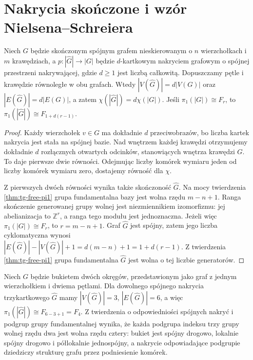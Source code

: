 \section{Nakrycia skończone i wzór Nielsena--Schreiera}
\label{sec:tg-finite-cover}

\begin{twierdzenie}
Niech $G$ będzie skończonym spójnym grafem nieskierowanym
o $n$ wierzchołkach i $m$ krawędziach, a
$p:|\widehat G|\to|G|$ będzie $d$-kartkowym nakryciem grafowym
o spójnej przestrzeni nakrywającej, gdzie $d\geq1$
jest liczbą całkowitą. Dopuszczamy pętle i krawędzie
równoległe w obu grafach.
Wtedy $|V(\widehat G)|=d|V(G)|$ oraz
$|E(\widehat G)|=d|E(G)|$, a zatem
$\chi(|\widehat G|)=d\chi(|G|)$.
Jeśli $\pi_1(|G|)\cong F_r$, to
$\pi_1(|\widehat G|)\cong F_{1+d(r-1)}$.
\end{twierdzenie}

\begin{proof}
Każdy wierzchołek $v\in G$ ma dokładnie $d$ przeciwobrazów,
bo liczba kartek nakrycia jest stała na spójnej bazie.
Nad wnętrzem każdej krawędzi otrzymujemy dokładnie $d$
rozłącznych otwartych odcinków, stanowiących wnętrza
krawędzi $\widehat G$. To daje pierwsze dwie równości.
Odejmując liczby komórek wymiaru jeden od liczby
komórek wymiaru zero, dostajemy równość dla $\chi$.

Z pierwszych dwóch równości wynika także skończoność
$\widehat G$. Na mocy twierdzenia \ref{thm:tg-free-pi1}
grupa fundamentalna bazy jest wolna rzędu $m-n+1$.
Ranga skończenie generowanej grupy wolnej jest
niezmiennikiem izomorfizmu: jej abelianizacja to
$\mathbb Z^r$, a ranga tego modułu jest jednoznaczna.
Jeżeli więc $\pi_1(|G|)\cong F_r$, to $r=m-n+1$.
Graf $\widehat G$ jest spójny, zatem jego liczba cyklomatyczna
wynosi
$|E(\widehat G)|-|V(\widehat G)|+1
=d(m-n)+1=1+d(r-1)$.
Z twierdzenia \ref{thm:tg-free-pi1} grupa fundamentalna
$\widehat G$ jest wolna o tej liczbie generatorów.
\end{proof}

\begin{przyklad}
Niech $G$ będzie bukietem dwóch okręgów, przedstawionym jako
graf z jednym wierzchołkiem i dwiema pętlami. Dla dowolnego
spójnego nakrycia trzykartkowego $\widehat G$ mamy
$|V(\widehat G)|=3$, $|E(\widehat G)|=6$, a więc
$\pi_1(|\widehat G|)\cong F_{6-3+1}=F_4$.
Z twierdzenia o odpowiedniości spójnych nakryć
i podgrup grupy fundamentalnej wynika, że każda
podgrupa indeksu trzy grupy wolnej rzędu dwa jest
wolna rzędu cztery: bukiet jest spójny drogowo,
lokalnie spójny drogowo i półlokalnie jednospójny,
a nakrycie odpowiadające podgrupie dziedziczy
strukturę grafu przez podniesienie komórek.
\end{przyklad}

